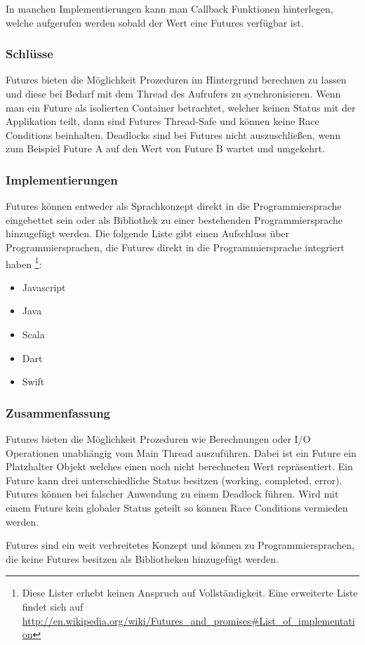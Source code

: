 In manchen Implementierungen kann man Callback Funktionen hinterlegen, welche aufgerufen werden sobald der Wert eine Futures verfügbar ist. 

\subsubsection{Schlüsse}
Futures bieten die Möglichkeit Prozeduren im Hintergrund berechnen zu lassen und diese bei Bedarf mit dem Thread des Aufrufers zu synchronisieren. Wenn man ein Future als isolierten Container betrachtet, welcher keinen Status mit der Applikation teilt, dann sind Futures Thread-Safe und können keine Race Conditions beinhalten. Deadlocks sind bei Futures nicht auszuschließen, wenn zum Beispiel Future A auf den Wert von Future B wartet und umgekehrt.

\subsubsection{Implementierungen}
Futures können entweder als Sprachkonzept direkt in die Programmiersprache eingebettet sein oder als Bibliothek zu einer bestehenden Programmiersprache hinzugefügt werden. Die folgende Liste gibt einen Aufschluss über Programmiersprachen, die Futures direkt in die Programmiersprache integriert haben \footnote{Diese Lister erhebt keinen Anspruch auf Vollständigkeit. Eine erweiterte Liste findet sich auf \url{http://en.wikipedia.org/wiki/Futures_and_promises#List_of_implementation}}:

\begin{itemize}
  \item Javascript
  \item Java
  \item Scala
  \item Dart
  \item Swift
\end{itemize}  

\subsubsection{Zusammenfassung}
Futures bieten die Möglichkeit Prozeduren wie Berechnungen oder I/O Operationen unabhängig vom Main Thread auszuführen. Dabei ist ein Future ein Platzhalter Objekt welches einen noch nicht berechneten Wert repräsentiert. Ein Future kann drei unterschiedliche Status besitzen (working, completed, error). Futures können bei falscher Anwendung zu einem Deadlock führen. Wird mit einem Future kein globaler Status geteilt so können Race Conditions vermieden werden. 

Futures sind ein weit verbreitetes Konzept und können zu Programmiersprachen, die keine Futures besitzen als Bibliotheken hinzugefügt werden.